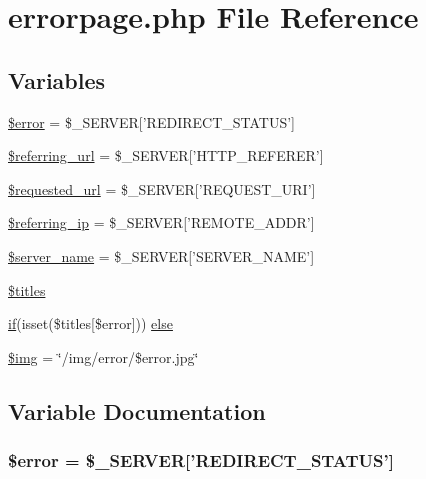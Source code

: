 \hypertarget{errorpage_8php}{\section{errorpage.\+php File Reference}
\label{errorpage_8php}
}
\subsection*{Variables}
\begin{DoxyCompactItemize}
\item 
\hyperlink{errorpage_8php_aeba2ab722cedda53dbb7ec1a59f45550}{\$error} = \$\+\_\+\+S\+E\+R\+V\+E\+R\mbox{[}'R\+E\+D\+I\+R\+E\+C\+T\+\_\+\+S\+T\+A\+T\+U\+S'\mbox{]}
\item 
\hyperlink{errorpage_8php_ad29da35a7cf10daf39c9ce647e7e30e3}{\$referring\+\_\+url} = \$\+\_\+\+S\+E\+R\+V\+E\+R\mbox{[}'H\+T\+T\+P\+\_\+\+R\+E\+F\+E\+R\+E\+R'\mbox{]}
\item 
\hyperlink{errorpage_8php_a479ad54df71804ffafdcecb6f67ab5e4}{\$requested\+\_\+url} = \$\+\_\+\+S\+E\+R\+V\+E\+R\mbox{[}'R\+E\+Q\+U\+E\+S\+T\+\_\+\+U\+R\+I'\mbox{]}
\item 
\hyperlink{errorpage_8php_ab8e19a239e2e9e057a08c7cb0ba2a832}{\$referring\+\_\+ip} = \$\+\_\+\+S\+E\+R\+V\+E\+R\mbox{[}'R\+E\+M\+O\+T\+E\+\_\+\+A\+D\+D\+R'\mbox{]}
\item 
\hyperlink{errorpage_8php_a26d95fc7e65c52080643099fed9f0057}{\$server\+\_\+name} = \$\+\_\+\+S\+E\+R\+V\+E\+R\mbox{[}'S\+E\+R\+V\+E\+R\+\_\+\+N\+A\+M\+E'\mbox{]}
\item 
\hyperlink{errorpage_8php_a26c001c5d5d900be2bebf55257d9cdfb}{\$titles}
\item 
\hyperlink{login__old_8php_a4ac1118c2e44c513a674bc1793ba6c90}{if}(isset(\$titles\mbox{[}\$error\mbox{]})) \hyperlink{errorpage_8php_ac9c33c396cfda3d13179fe40c78be2ff}{else}
\item 
\hyperlink{errorpage_8php_a56a9a0da0c26b3d3029cea47a6b9292f}{\$img} = \char`\"{}/img/error/\$error.\+jpg\char`\"{}
\end{DoxyCompactItemize}


\subsection{Variable Documentation}
\hypertarget{errorpage_8php_aeba2ab722cedda53dbb7ec1a59f45550}{
\subsubsection[{\$error}]{\setlength{\rightskip}{0pt plus 5cm}\$error = \$\+\_\+\+S\+E\+R\+V\+E\+R\mbox{[}'R\+E\+D\+I\+R\+E\+C\+T\+\_\+\+S\+T\+A\+T\+U\+S'\mbox{]}}}\label{errorpage_8php_aeba2ab722cedda53dbb7ec1a59f45550}


